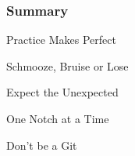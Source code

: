 

\begin{frame}
    \frametitle{Summary}
    \begin{description}
        \item<+->Practice Makes Perfect
        \item<+->[Authority] Schmooze, Bruise or Lose
        \item<+->[Priorities] Expect the Unexpected
        \item<+->[Style] One Notch at a Time
        \item<+->[Process] Don't be a Git
    \end{description}
\end{frame}
